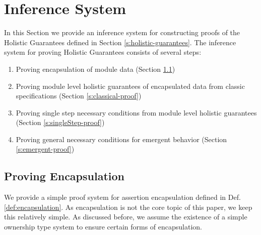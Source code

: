 \section{Inference System}  

In this Section we provide an inference system for constructing 
proofs of the Holistic Guarantees defined in Section \ref{s:holistic-guarantees}.
The inference system for proving Holistic Guarantees consists of several steps:
\begin{enumerate}
\item
Proving encapsulation of module data (Section \ref{s:encap-proof})
\item
Proving module level holistic guarantees of encapsulated data from classic specifications (Section \ref{s:classical-proof})
\item
Proving single step necessary conditions from module level holistic guarantees (Section \ref{s:singleStep-proof})
\item
Proving general necessary conditions for emergent behavior (Section \ref{s:emergent-proof})
\end{enumerate}

\subsection{Proving Encapsulation}
\label{s:encap-proof}

We provide a simple proof system for assertion encapsulation defined in Def. \ref{def:encapsulation}. As encapsulation is not the core topic of this paper, we keep this
relatively simple. As discussed before, we assume the existence of a simple ownership type system to ensure certain forms of encapsulation.

